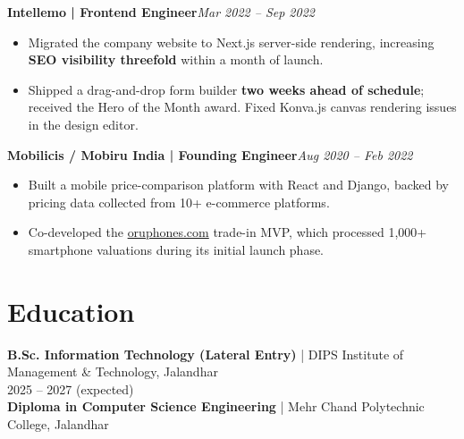 \documentclass[a4paper,10pt]{article}
\newcommand{\job}[2]{\textbf{#1}\hfill\textit{#2}}
\begin{document}
\job{Intellemo | Frontend Engineer}{Mar 2022 -- Sep 2022}
\begin{itemize}
\item Migrated the company website to Next.js server-side rendering, increasing \textbf{SEO visibility threefold} within a month of launch.
\item Shipped a drag-and-drop form builder \textbf{two weeks ahead of schedule}; received the Hero of the Month award. Fixed Konva.js canvas rendering issues in the design editor.
\end{itemize}
\job{Mobilicis / Mobiru India | Founding Engineer}{Aug 2020 -- Feb 2022}
\begin{itemize}
\item Built a mobile price-comparison platform with React and Django, backed by pricing data collected from 10+ e-commerce platforms.
\item Co-developed the \href{https://www.oruphones.com}{oruphones.com} trade-in MVP, which processed 1,000+ smartphone valuations during its initial launch phase.
\end{itemize}
\section{Education}
\textbf{B.Sc. Information Technology (Lateral Entry)} | DIPS Institute of Management \& Technology, Jalandhar\\
2025 -- 2027 (expected)\\
\textbf{Diploma in Computer Science Engineering} | Mehr Chand Polytechnic College, Jalandhar
\end{document}
